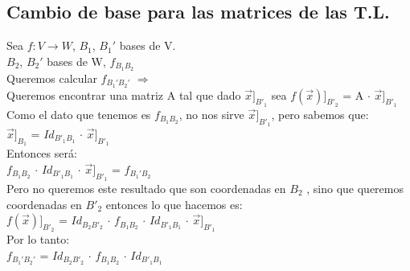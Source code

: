 \documentclass[11pt]{article}
\begin{document}
\subsection{Cambio de base para las matrices de las T.L.}
Sea $f: V \rightarrow W$, $B_1$, $B_{1}'$ bases de V. \\
$B_2$, $B_{2}'$ bases de W, \textbardbl $f$\textbardbl$_{B_1B_2}$ \\
Queremos calcular \textbardbl $f$\textbardbl$_{ B_{1}' B_{2}'}$ $\Rightarrow$ \\Queremos encontrar una matriz A tal que dado $\vec{x}]_{B'_1}$ sea $f(\vec{x})]_{B'_2}$ = A $\cdot$ $\vec{x}]_{B'_1}$ \\
Como el dato que tenemos es \textbardbl $f$\textbardbl$_{B_1B_2}$, no nos sirve $\vec{x}]_{B'_1}$, pero sabemos que: \\
$\vec{x}]_{B_1}$ = 
\textbardbl $Id$\textbardbl$_{B'_1B_{1}}$ 
$\cdot$
$\vec{x}]_{B'_1}$ \\
Entonces será: \\
\textbardbl $f$\textbardbl$_{B_1B_2}$
$\cdot$
\textbardbl $Id$\textbardbl$_{B'_1B_{1}}$ 
$\cdot$
$\vec{x}]_{B'_1}$ =
\textbardbl $f$\textbardbl$_{B_1'B_2}$\\
Pero no queremos este resultado que son coordenadas en $B_2$ , sino que queremos coordenadas en $B'_2$ entonces lo que hacemos es: \\
$f(\vec{x})]_{B'_2}$ = 
\textbardbl $Id$\textbardbl$_{B_2B'_{2}}$ 
$\cdot$
\textbardbl $f$\textbardbl$_{B_1B_2}$
$\cdot$
\textbardbl $Id$\textbardbl$_{B'_1B_{1}}$ 
$\cdot$
$\vec{x}]_{B'_1}$\\
Por lo tanto: \\
\textbardbl $f$\textbardbl$_{ B_{1}' B_{2}'}$ = 
\textbardbl $Id$\textbardbl$_{B_2B'_{2}}$
$\cdot$
\textbardbl $f$\textbardbl$_{B_1B_2}$
$\cdot$
\textbardbl $Id$\textbardbl$_{B'_1B_{1}}$ 
\end{document}
